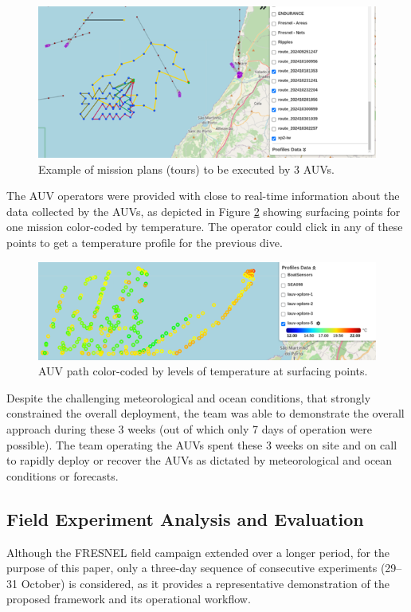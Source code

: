 \begin{figure}
    \centering
    \includegraphics[width=.7\linewidth]{fig/missionplans.png}
    \caption{Example of mission plans (tours) to be executed by 3 AUVs.}
    \label{fig:missionplans}
\end{figure}


The AUV operators were provided with close to real-time information
about the data collected by the AUVs, as depicted in Figure
\ref{fig:temperatureprofiles} showing surfacing points for one mission
color-coded by temperature. The operator could click in any of these
points to get a temperature profile for the previous dive.

 \begin{figure}
    \centering
    \includegraphics[width=.7\linewidth]{fig/temperatureprofiles.png}
    \caption{AUV path color-coded by levels of temperature at surfacing points.}
    \label{fig:temperatureprofiles}
\end{figure}



Despite the challenging meteorological and ocean conditions, that
strongly constrained the overall deployment, the \proj team was able to
demonstrate the overall approach during these 3 weeks (out of which only
7 days of operation were possible). The team operating the AUVs spent
these 3 weeks on site and on call to rapidly deploy or recover the AUVs
as dictated by meteorological and ocean conditions or forecasts.



\subsection{Field Experiment Analysis and Evaluation}

Although the FRESNEL field campaign extended over a longer period, for
the purpose of this paper, only a three-day sequence of consecutive
experiments (29–31 October) is considered, as it provides a
representative demonstration of the proposed framework and its
operational workflow.


